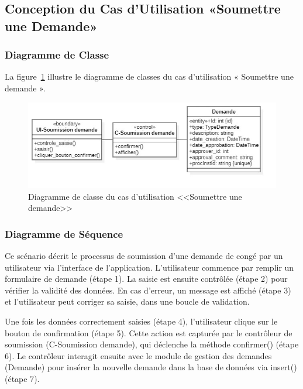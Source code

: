 \subsection{Conception du Cas d'Utilisation «Soumettre une Demande»}
\subsubsection{Diagramme de Classe}
La figure~\ref{fig:class_submit_request} illustre le diagramme de classes du cas d'utilisation « Soumettre une demande ».
\begin{figure}[h]
     \centering
     \includegraphics[width=17cm]{images/C-Soumission demande.jpg}
     \caption{Diagramme de classe du cas d'utilisation <<Soumettre une demande>>}
     \label{fig:class_submit_request}
\end{figure}
\subsubsection{Diagramme de Séquence}
Ce scénario décrit le processus de soumission d’une demande de congé par un utilisateur via l’interface de l’application. L’utilisateur commence par remplir un formulaire de demande (étape 1). La saisie est ensuite contrôlée (étape 2) pour vérifier la validité des données. En cas d’erreur, un message est affiché (étape 3) et l’utilisateur peut corriger sa saisie, dans une boucle de validation.

Une fois les données correctement saisies (étape 4), l’utilisateur clique sur le bouton de confirmation (étape 5). Cette action est capturée par le contrôleur de soumission (C-Soumission demande), qui déclenche la méthode confirmer() (étape 6). Le contrôleur interagit ensuite avec le module de gestion des demandes (Demande) pour insérer la nouvelle demande dans la base de données via insert() (étape 7).

